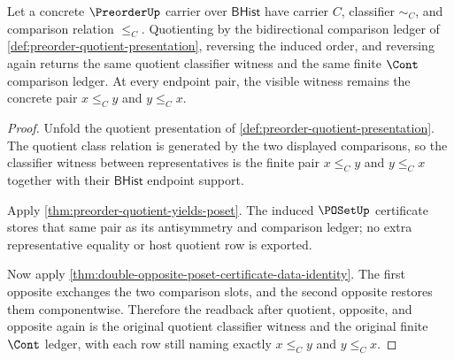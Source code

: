 \begin{theorem}
\label{thm:poset-quotient-opposite-involutive-readback}
Let a concrete $\PreorderUp$ carrier over $\mathsf{BHist}$ have carrier $C$,
classifier $\sim_C$, and comparison relation $\le_C$. Quotienting by the
bidirectional comparison ledger of
\autoref{def:preorder-quotient-presentation}, reversing the induced order, and
reversing again returns the same quotient classifier witness and the same
finite $\Cont$ comparison ledger. At every endpoint pair, the visible witness
remains the concrete pair $x\le_C y$ and $y\le_C x$.
\end{theorem}
\begin{proof}
Unfold the quotient presentation of
\autoref{def:preorder-quotient-presentation}. The quotient class relation is
generated by the two displayed comparisons, so the classifier witness between
representatives is the finite pair $x\le_C y$ and $y\le_C x$ together with
their $\mathsf{BHist}$ endpoint support.

Apply \autoref{thm:preorder-quotient-yields-poset}. The induced $\POSetUp$
certificate stores that same pair as its antisymmetry and comparison ledger;
no extra representative equality or host quotient row is exported.

Now apply
\autoref{thm:double-opposite-poset-certificate-data-identity}. The first
opposite exchanges the two comparison slots, and the second opposite restores
them componentwise. Therefore the readback after quotient, opposite, and
opposite again is the original quotient classifier witness and the original
finite $\Cont$ ledger, with each row still naming exactly $x\le_C y$ and
$y\le_C x$.
\end{proof}
